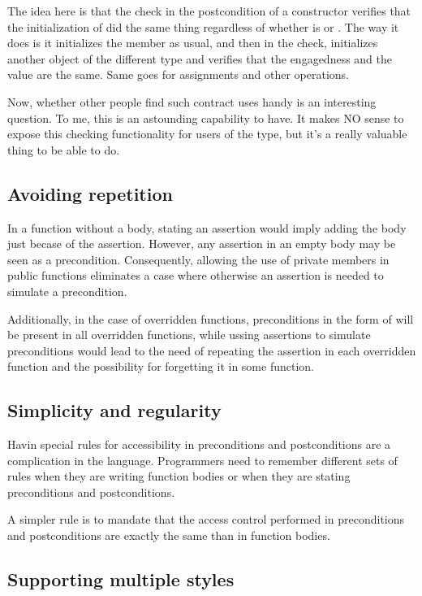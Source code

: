 The idea here is that the check in the postcondition of a constructor verifies
that the initialization of  did the same thing regardless of whether
 is  or . The way it does is it
initializes the member as usual, and then in the check, initializes another
object of the different type and verifies that the engagedness and the value
are the same. Same goes for assignments and other operations.

Now, whether other people find such contract uses handy is an interesting
question. To me, this is an astounding capability to have. It makes NO sense to
expose this checking functionality for users of the type, but it's a really
valuable thing to be able to do.


\subsection{Avoiding repetition}

In a function without a body, stating an assertion would imply adding the body
just becase of the assertion. However, any assertion in an empty body may be
seen as a precondition. Consequently, allowing the use of private members in
public functions eliminates a case where otherwise an assertion is needed to
simulate a precondition.

Additionally, in the case of overridden functions, preconditions in the form of
\cppid{[[}\cppid{]]} will be present in all overridden
functions, while ussing assertions to simulate preconditions would lead to the
need of repeating the assertion in each overridden function and the possibility
for forgetting it in some function. 

\subsection{Simplicity and regularity}

Havin special rules for accessibility in preconditions and postconditions are a
complication in the language. Programmers need to remember different sets of
rules when they are writing function bodies or when they are stating
preconditions and postconditions.

A simpler rule is to mandate that the access control performed in preconditions
and postconditions are exactly the same than in function bodies.

\subsection{Supporting multiple styles}


